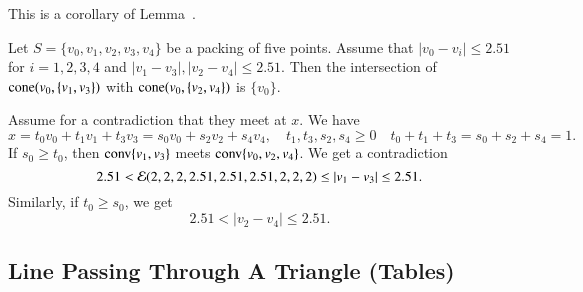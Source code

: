 \begin{tarskidata}
\begin{tarski}
\begin{proved}
This is a corollary of Lemma~.
\swallowed\end{proved}
\end{tarski}





\begin{tarski}

\begin{lemma}
Let $S=\{v_0,v_1,v_2,v_3,v_4\}$ be a packing of five points.
Assume  that $|v_0-v_i|\le 2.51$ for $i=1,2,3,4$ and
$|v_1-v_3|,|v_2-v_4|\le 2.51$. Then the intersection of
${\operatorname{cone}}(v_0,\{v_1,v_3\})$ with
${\operatorname{cone}}(v_0,\{v_2,v_4\})$ is $\{v_0\}$.
\end{lemma}

\begin{proved}  Assume for a contradiction that they meet at $x$.
We have
  $$x = t_0 v_0 + t_1 v_1 + t_3 v_3 = s_0 v_0 + s_2 v_2 + s_4 v_4,
  \quad t_1,t_3,s_2,s_4\ge0\quad t_0+t_1+t_3=s_0+s_2+s_4=1.
  $$
If $s_0\ge t_0$, then ${\operatorname{conv}}\{v_1,v_3\}$ meets 
${\operatorname{conv}}\{v_0,v_2,v_4\}$.  
We get a
contradiction
    $$2.51 < {\mathcal E}(2,2,2,2.51,2.51,2.51,2,2,2) \le |v_1-v_3|\le 2.51.$$
Similarly, if $t_0\ge s_0$, we get
    $$2.51 < |v_2-v_4|\le 2.51.$$
\swallowed\end{proved}
\end{tarski}








\begin{tarski}
\section{Line Passing Through A Triangle (Tables)}


\end{tarski}
\end{tarskidata}
